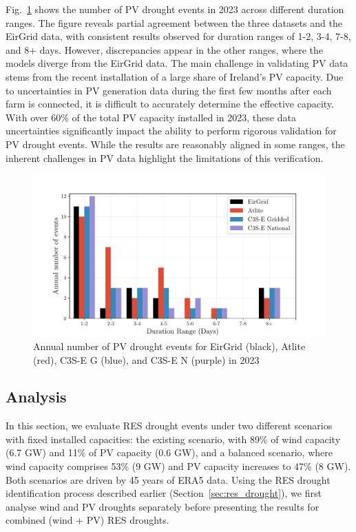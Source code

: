 \documentclass[a4paper, 11pt]{article}
\begin{document}
Fig.~\ref{fig:bar_number_events_verification_pv} shows the number of PV drought events in 2023 across different duration ranges. The figure reveals partial agreement between the three datasets and the EirGrid data, with consistent results observed for duration ranges of 1-2, 3-4, 7-8, and 8+ days. However, discrepancies appear in the other ranges, where the models diverge from the EirGrid data. The main challenge in validating PV data stems from the recent installation of a large share of Ireland’s PV capacity. Due to uncertainties in PV generation data during the first few months after each farm is connected, it is difficult to accurately determine the effective capacity. With over 60\% of the total PV capacity installed in 2023, these data uncertainties significantly impact the ability to perform rigorous validation for PV drought events. While the results are reasonably aligned in some ranges, the inherent challenges in PV data highlight the limitations of this verification.

\begin{figure}[!ht]
	\centering
	\includegraphics[width=\textwidth]{verification_pv_bar}
	\caption{Annual number of PV drought events for EirGrid (black), Atlite (red), C3S-E G (blue), and C3S-E N (purple) in 2023}
	\label{fig:bar_number_events_verification_pv}
\end{figure}

\newpage
\subsection{Analysis}
\label{sec:Analysis}

In this section, we evaluate RES drought events under two different scenarios with fixed installed capacities: the existing scenario, with 89\% of wind capacity (6.7 GW) and 11\% of PV capacity (0.6 GW), and a balanced scenario, where wind capacity comprises 53\% (9 GW) and PV capacity increases to 47\% (8 GW). Both scenarios are driven by 45 years of ERA5 data. Using the RES drought identification process described earlier (Section~\ref{sec:res_drought}), we first analyse wind and PV droughts separately before presenting the results for combined (wind + PV) RES droughts.
\end{document}
